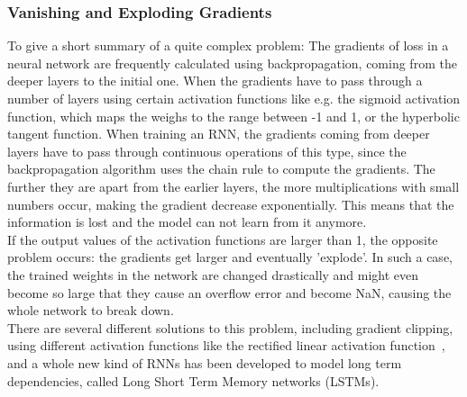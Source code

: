 \documentclass[
	a4paper,
	pagesize,
	pdftex,
	12pt,
	twoside, %
	BCOR=5mm, %
	ngerman,
	fleqn,
	final,
	]{scrartcl}
\begin{document}
\subsubsection{Vanishing and Exploding Gradients}
To give a short summary of a quite complex problem: The gradients of loss in a neural network are frequently calculated using backpropagation, coming from the deeper layers to the initial one. When the gradients have to pass through a number of layers using certain activation functions like e.g. the sigmoid activation function, which maps the weighs to the range between -1 and 1, or the hyperbolic tangent function. When training an RNN, the gradients coming from deeper layers have to pass through continuous operations of this type, since the backpropagation algorithm uses the chain rule to compute the gradients. The further they are apart from the earlier layers, the more multiplications with small numbers occur, making the gradient decrease exponentially. This means that the information is lost and the model can not learn from it anymore.\\
If the output values of the activation functions are larger than 1, the opposite problem occurs: the gradients get larger and eventually 'explode'. In such a case, the trained weights in the network are changed drastically and might even become so large that they cause an overflow error and become NaN, causing the whole network to break down.\\
There are several different solutions to this problem, including gradient clipping, using different activation functions like the rectified linear activation function~\cite{Glorot.2011}, and a whole new kind of RNNs has been developed to model long term dependencies, called Long Short Term Memory networks (LSTMs).
\end{document}
